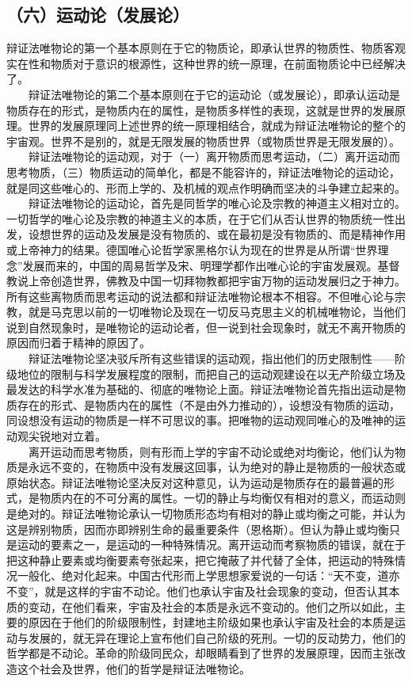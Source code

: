 \documentclass[cn,11pt,chinese]{elegantbook}
\def\myformat#1{\hfil\hfil #1}
\begin{document}
\subsection*{\myformat{（六）运动论（发展论）}}
辩证法唯物论的第一个基本原则在于它的物质论，即承认世界的物质性、物质客观实在性和物质对于意识的根源性，这种世界的统一原理，在前面物质论中已经解决了。\\
　　辩证法唯物论的第二个基本原则在于它的运动论（或发展论），即承认运动是物质存在的形式，是物质内在的属性，是物质多样性的表现，这就是世界的发展原理。世界的发展原理同上述世界的统一原理相结合，就成为辩证法唯物论的整个的宇宙观。世界不是别的，就是无限发展的物质世界（或物质世界是无限发展的）。\\
　　辩证法唯物论的运动观，对于（一）离开物质而思考运动，（二）离开运动而思考物质，（三）物质运动的简单化，都是不能容许的，辩证法唯物论的运动论，就是同这些唯心的、形而上学的、及机械的观点作明确而坚决的斗争建立起来的。\\
　　辩证法唯物论的运动论，首先是同哲学的唯心论及宗教的神道主义相对立的。一切哲学的唯心论及宗教的神道主义的本质，在于它们从否认世界的物质统一性出发，设想世界的运动及发展是没有物质的、或在最初是没有物质的、而是精神作用或上帝神力的结果。德国唯心论哲学家黑格尔认为现在的世界是从所谓“世界理念”发展而来的，中国的周易哲学及宋、明理学都作出唯心论的宇宙发展观。基督教说上帝创造世界，佛教及中国一切拜物教都把宇宙万物的运动发展归之于神力。所有这些离物质而思考运动的说法都和辩证法唯物论根本不相容。不但唯心论与宗教，就是马克思以前的一切唯物论及现在一切反马克思主义的机械唯物论，当他们说到自然现象时，是唯物论的运动论者，但一说到社会现象时，就无不离开物质的原因而归着于精神的原因了。\\
　　辩证法唯物论坚决驳斥所有这些错误的运动观，指出他们的历史限制性——阶级地位的限制与科学发展程度的限制，而把自己的运动观建设在以无产阶级立场及最发达的科学水准为基础的、彻底的唯物论上面。辩证法唯物论首先指出运动是物质存在的形式、是物质内在的属性（不是由外力推动的），设想没有物质的运动，同设想没有运动的物质是一样不可思议的事。把唯物的运动观同唯心的及唯神的运动观尖锐地对立着。\\
　　离开运动而思考物质，则有形而上学的宇宙不动论或绝对均衡论，他们认为物质是永远不变的，在物质中没有发展这回事，认为绝对的静止是物质的一般状态或原始状态。辩证法唯物论坚决反对这种意见，认为运动是物质存在的最普遍的形式，是物质内在的不可分离的属性。一切的静止与均衡仅有相对的意义，而运动则是绝对的。辩证法唯物论承认一切物质形态均有相对的静止或均衡之可能，并认为这是辨别物质，因而亦即辨别生命的最重要条件（恩格斯）。但认为静止或均衡只是运动的要素之一，是运动的一种特殊情况。离开运动而考察物质的错误，就在于把这种静止要素或均衡要素夸张起来，把它掩蔽了并代替了全体，把运动的特殊情况一般化、绝对化起来。中国古代形而上学思想家爱说的一句话：“天不变，道亦不变”，就是这样的宇宙不动论。他们也承认宇宙及社会现象的变动，但否认其本质的变动，在他们看来，宇宙及社会的本质是永远不变动的。他们之所以如此，主要的原因在于他们的阶级限制性，封建地主阶级如果也承认宇宙及社会的本质是运动与发展的，就无异在理论上宣布他们自己阶级的死刑。一切的反动势力，他们的哲学都是不动论。革命的阶级同民众，却眼睛看到了世界的发展原理，因而主张改造这个社会及世界，他们的哲学是辩证法唯物论。 \\
\end{document}
